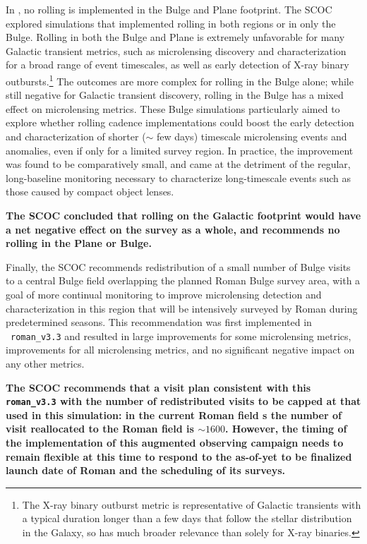 In , no rolling is implemented in the Bulge and Plane footprint. The SCOC explored simulations that implemented rolling in both regions or in only the Bulge.
Rolling in both the Bulge and Plane is extremely unfavorable for many Galactic transient metrics, such as microlensing discovery and characterization for a broad range of event timescales, as well as early detection of X-ray binary outbursts.\footnote{The X-ray binary outburst metric is representative of Galactic transients with a typical duration longer than a few days that follow the stellar distribution in the Galaxy, so has much broader relevance than solely for X-ray binaries.} The outcomes are more complex for rolling in the Bulge alone; while still negative for Galactic transient discovery, rolling in the Bulge has a mixed effect on microlensing metrics. These Bulge simulations particularly aimed to explore whether rolling cadence implementations could boost the early detection and characterization of shorter ($\sim$ few days) timescale microlensing events and anomalies, even if only for a limited survey region. In practice, the improvement was found to be comparatively small, and came at the detriment of the regular, long-baseline monitoring necessary to characterize long-timescale events such as those caused by compact object lenses.   


{\bf The SCOC concluded that rolling on the Galactic footprint would have a net negative effect on the survey as a whole, and recommends no rolling in the Plane or Bulge.}

Finally, the SCOC recommends redistribution of a small number of Bulge visits to 
a central Bulge field overlapping the planned Roman Bulge survey area, with a goal of more continual monitoring to improve microlensing detection and characterization in this region that will be intensively surveyed by Roman during predetermined seasons.
This recommendation was first implemented in \opsim\ \texttt{roman\_v3.3} and resulted in large improvements for some microlensing metrics, improvements for all microlensing metrics, and no significant negative impact on any other metrics. 

{\bf The SCOC recommends that a visit plan consistent with this \texttt{roman\_v3.3} with the number of redistributed visits to be capped at that used in this simulation: in the current Roman field \opsim s the number of visit reallocated to the Roman field is $\sim1600$. However, the timing of the implementation of this augmented observing campaign needs to remain flexible at this time to respond to the as-of-yet to be finalized launch date of Roman and the scheduling of its surveys.}


